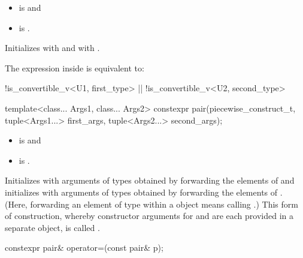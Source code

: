 \begin{itemdescr}
\pnum
\constraints
\begin{itemize}
\item {} is  and
\item {} is .
\end{itemize}

\pnum
\effects
Initializes  with
and  with
.

\pnum
\remarks
The expression inside  is equivalent to:
\begin{codeblock}
!is_convertible_v<U1, first_type> || !is_convertible_v<U2, second_type>
\end{codeblock}
\end{itemdescr}

%
\begin{itemdecl}
template<class... Args1, class... Args2>
  constexpr pair(piecewise_construct_t,
                 tuple<Args1...> first_args, tuple<Args2...> second_args);
\end{itemdecl}

\begin{itemdescr}
\pnum
\mandates
\begin{itemize}
\item {} is  and
\item {} is .
\end{itemize}

\pnum
\effects
Initializes  with arguments of types
 obtained by forwarding the elements of 
and initializes  with arguments of types 
obtained by forwarding the elements of . (Here, forwarding
an element  of type  within a  object means calling
.) This form of construction, whereby constructor
arguments for  and  are each provided in a separate
 object, is called .
\end{itemdescr}

%
\begin{itemdecl}
constexpr pair& operator=(const pair& p);
\end{itemdecl}

